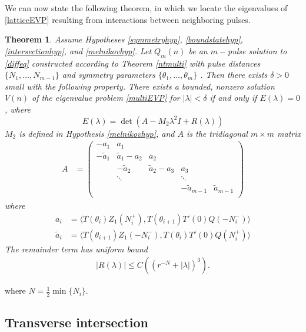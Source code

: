 \documentclass[12pt]{elsarticle}
\newtheorem{theorem}{Theorem}
\begin{document}
We can now state the following theorem, in which we locate the eigenvalues of \eqref{latticeEVP} resulting from interactions between neighboring pulses.

\begin{theorem}\label{stabilitytheorem}
Assume Hypotheses \ref{symmetryhyp}, \ref{boundstatehyp}, \ref{intersectionhyp}, and \ref{melnikovhyp}. Let $Q_m(n)$ be an $m-$pulse solution to \eqref{diffeq} constructed according to Theorem \ref{ntmulti} with pulse distances $\{ N_1, \dots, N_{m-1}\}$ and symmetry parameters $\{\theta_1, \dots, \theta_m\}$ 
. Then there exists $\delta > 0$ small with the following property. There exists a bounded, nonzero solution $V(n)$ of the eigenvalue problem \eqref{multiEVP} for $|\lambda| < \delta$ if and only if $E(\lambda) = 0$, where
\begin{equation}\label{Elambda}
E(\lambda) = \det(A - M_2 \lambda^2 I + R(\lambda))
\end{equation}
$M_2$ is defined in Hypothesis \ref{melnikovhyp}, and $A$ is the tridiagonal $m \times m$ matrix
\begin{align}\label{matrixA}
A &= \begin{pmatrix}
-a_1 & a_1 & & & \\
-\tilde{a}_1 & \tilde{a}_1 - a_2 & a_2 \\
& -\tilde{a}_2 & \tilde{a}_2 - a_3 & a_3 \\
& \ddots & & \ddots \\
& & & -\tilde{a}_{m-1} & \tilde{a}_{m-1}  \\
\end{pmatrix}
\end{align}
where
\begin{align*}
a_i &= \langle T(\theta_i) Z_1(N_i^+), T(\theta_{i+1}) T'(0)Q(-N_i^-) \rangle \\
\tilde{a}_i &= \langle T(\theta_{i+1}) Z_1(-N_i^-), T(\theta_i) T'(0)Q(N_i^+) \rangle
\end{align*}
The remainder term has uniform bound
\begin{align}\label{Rbound2}
|R(\lambda)| \leq C\left( (r^{-N} + |\lambda|)^3 \right).
\end{align}
\end{theorem}
where $N = \frac{1}{2}\min\{N_i\}$.

\subsection{Transverse intersection}
\end{document}
